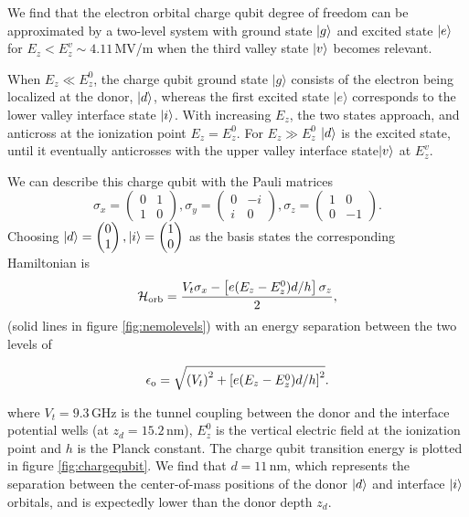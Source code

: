 We find that the electron orbital charge qubit degree of freedom can be approximated by a two-level system with ground state $\ket{g}$ and excited state $\ket{e}$ for $E_z<E_z^v\sim 4.11\,$MV/m when the third valley state $\ket{v}$ becomes relevant. 

When $E_z \ll E_z^0$, the charge qubit ground state $\lvert g \rangle $ consists of the electron being  localized at the donor, $\ket{d}$, whereas the first excited state $\lvert e \rangle $ corresponds to the lower valley interface state $\ket{i}$. 
With increasing $E_z$, the two states approach, and anticross at the ionization point $E_z = E_z^0$. For $E_z\gg E_z^0$ $\ket{d}$ is the excited state, until it eventually anticrosses with the upper valley interface state$\ket{v}$ at $E_z^v$. 

We can describe this charge qubit with the Pauli matrices 
\begin{equation}\sigma_x=\begin{pmatrix}0 & 1\\1 &0 \end{pmatrix}, \sigma_y=\begin{pmatrix}0 &-i\\i &0 \end{pmatrix}, \sigma_z=\begin{pmatrix}1 &0\\0 &-1 \end{pmatrix}.
\end{equation} 
Choosing $\ket{d}=\begin{pmatrix}0\\1 \end{pmatrix},\ket{i}=\begin{pmatrix}1\\0\end{pmatrix}$ as the basis states the corresponding Hamiltonian is
\begin{equation} \label{eq:H_orb}
\mathcal{H}_{\rm orb}=\frac{V_t \sigma_x-\left[e(E_z - E_z^0) d/h\right]\sigma_z}{2},
\end{equation}
(solid lines in figure \ref{fig:nemolevels}) with an energy separation between the two levels of 

\begin{equation} \label{eq:e_o}
\epsilon_{\rm o}=\sqrt{\left(V_t\right)^2+\left[e(E_z - E_z^0) d/h\right]^2}.
\end{equation}

where $V_t=9.3\,$GHz is the tunnel coupling between the donor and the interface potential wells (at $z_d=15.2\,$nm), $E_z^0$ is the vertical electric field at the ionization point and $h$ is the Planck constant. The charge qubit transition energy is plotted in figure \ref{fig:chargequbit}.  We find that $d=11\,$nm, which represents the separation between the center-of-mass positions of the donor $\ket{d}$ and interface $\ket{i}$ orbitals, and is expectedly lower than the donor depth $z_d$.

